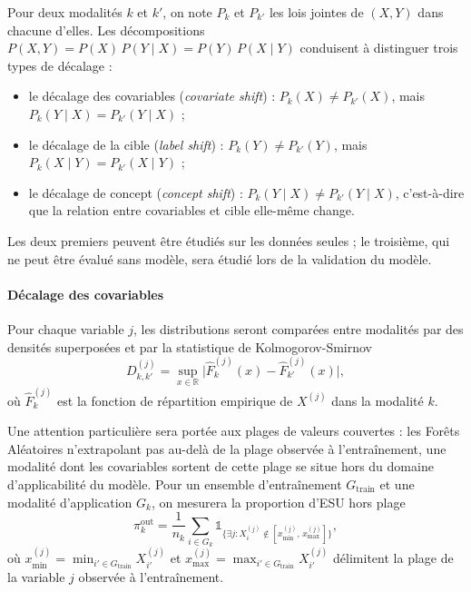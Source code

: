 		Pour deux modalités $k$ et $k'$, on note $P_k$ et $P_{k'}$ les lois jointes de $(X, Y)$ dans chacune d'elles. Les décompositions $P(X, Y) = P(X) \, P(Y \mid X) = P(Y) \, P(X \mid Y)$ conduisent à distinguer trois types de décalage \cite{morenotorres2012} :
		\begin{itemize}
			\item le décalage des covariables (\textit{covariate shift}) : $P_k(X) \ne P_{k'}(X)$, mais $P_k(Y \mid X) = P_{k'}(Y \mid X)$ ;
			\item le décalage de la cible (\textit{label shift}) : $P_k(Y) \ne P_{k'}(Y)$, mais $P_k(X \mid Y) = P_{k'}(X \mid Y)$ ;
			\item le décalage de concept (\textit{concept shift}) : $P_k(Y \mid X) \ne P_{k'}(Y \mid X)$, c'est-à-dire que la relation entre covariables et cible elle-même change.
		\end{itemize}
		Les deux premiers peuvent être étudiés sur les données seules ; le troisième, qui ne peut être évalué sans modèle, sera étudié lors de la validation du modèle.
		
		\paragraph{Décalage des covariables}
			Pour chaque variable $j$, les distributions seront comparées entre modalités par des densités superposées et par la statistique de Kolmogorov-Smirnov
			\begin{equation}\label{eq:ks}
				D_{k,k'}^{(j)} = \sup_{x \in \mathbb{R}} \bigl|\hat F_k^{(j)}(x) - \hat F_{k'}^{(j)}(x)\bigr|,
			\end{equation}
			où $\hat F_k^{(j)}$ est la fonction de répartition empirique de $X^{(j)}$ dans la modalité $k$.
			
			Une attention particulière sera portée aux plages de valeurs couvertes : les Forêts Aléatoires n'extrapolant pas au-delà de la plage observée à l'entraînement, une modalité dont les covariables sortent de cette plage se situe hors du domaine d'applicabilité du modèle. Pour un ensemble d'entraînement $G_{\text{train}}$ et une modalité d'application $G_k$, on mesurera la proportion d'ESU hors plage
			\begin{equation}\label{eq:horsplage}
				\pi_k^{\text{out}} = \frac{1}{n_k} \sum_{i \in G_k}
				\mathds{1}_{\bigl\{\exists j : X_i^{(j)} \notin [x_{\min}^{(j)},\, x_{\max}^{(j)}]\bigr\}},
			\end{equation}
			où $x_{\min}^{(j)} = \min_{i' \in G_{\text{train}}} X_{i'}^{(j)}$ et $x_{\max}^{(j)} = \max_{i' \in G_{\text{train}}} X_{i'}^{(j)}$ délimitent la plage de la variable $j$ observée à l'entraînement.
			
